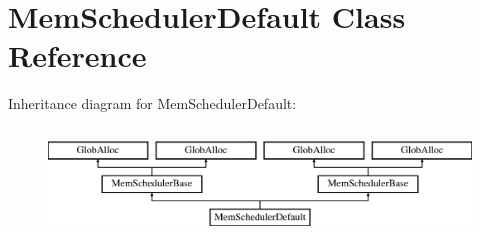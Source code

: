 \hypertarget{classMemSchedulerDefault}{\section{Mem\-Scheduler\-Default Class Reference}
\label{classMemSchedulerDefault}
}
Inheritance diagram for Mem\-Scheduler\-Default\-:\begin{figure}[H]
\begin{center}
\leavevmode
\includegraphics[height=2.896552cm]{classMemSchedulerDefault}
\end{center}
\end{figure}
